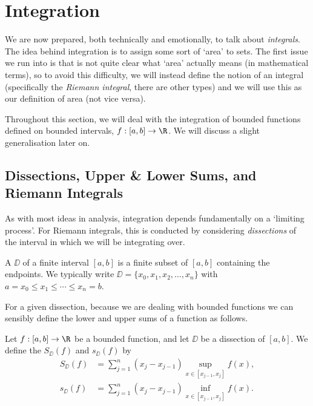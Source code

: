 \section{Integration}

We are now prepared, both technically and emotionally, to talk about \emph{integrals}. 
The idea behind integration is to assign some sort of `area' to sets. The first issue we run into is that is not quite clear what `area' actually means (in mathematical terms), so to avoid this difficulty, we will instead define the notion of an integral (specifically the \emph{Riemann integral}, there are other types) and we will use this as our definition of area (not vice versa). 

Throughout this section, we will deal with the integration of bounded functions defined on bounded intervals, $f: [a, b] \rightarrow \R$. We will discuss a slight generalisation later on.

\subsection{Dissections, Upper \& Lower Sums, and Riemann Integrals}


As with most ideas in analysis, integration depends fundamentally on a `limiting process'. For Riemann integrals, this is conducted by considering \emph{dissections} of the interval in which we will be integrating over.

\begin{definition}[Dissection]
	A  $\DD$ of a finite interval $[a, b]$ is a finite subset of $[a, b]$ containing the endpoints. We typically write $\DD = \{x_0, x_1, x_2, \dots, x_n\}$ with $a = x_0 \leq x_1 \leq \cdots \leq x_n = b$.
\end{definition}

For a given dissection, because we are dealing with bounded functions we can sensibly define the lower and upper sums of a function as follows.

\begin{definition}
	Let $f: [a, b] \rightarrow \R$ be a bounded function, and let $\DD$ be a dissection of $[a, b]$. We define the  $S_{\DD}(f)$ and  $s_{\DD}(f)$ by
	\begin{align*}
		S_{\DD}(f) &= \sum_{j = 1}^n (x_j - x_{j - 1}) \sup_{x \in [x_{j - 1}, x_j]} f(x), \\
		s_{\DD}(f) &= \sum_{j = 1}^n (x_j - x_{j - 1}) \inf_{x \in [x_{j - 1}, x_j]} f(x).
	\end{align*}
\end{definition}


